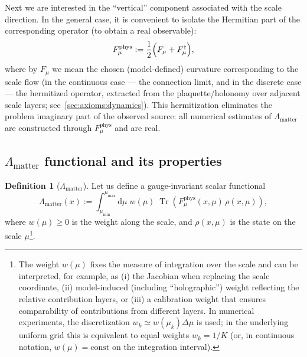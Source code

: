 \documentclass[11pt,a4paper]{article}
\DeclareMathOperator{\Tr}{Tr}
\newcommand{\dd}{\mathrm{d}}
\theoremstyle{definition}
\newtheorem{definition}{Definition}[section]
\theoremstyle{plain}
\theoremstyle{remark}
\begin{document}
Next we are interested in the “vertical” component associated with the scale direction.
In the general case, it is convenient to isolate the Hermitian part of the corresponding operator (to obtain a real observable):
\begin{equation}\label{eq:Fphys_def}
F_{\mu}^{\mathrm{phys}} := \frac{1}{2}\Bigl(F_{\mu}+F_{\mu}^\dagger\Bigr),
\end{equation}
where by $F_\mu$ we mean the chosen (model-defined) curvature corresponding to the scale flow
(in the continuous case --- the connection limit, and in the discrete case --- the hermitized operator,
extracted from the plaquette/holonomy over adjacent scale layers; see\ \cref{sec:axioms:dynamics}).
This hermitization eliminates the problem imaginary part of the observed source:
all numerical estimates of $\Lambda_{\mathrm{matter}}$ are constructed through $F_{\mu}^{\mathrm{phys}}$ and are real.

\subsection[Lambda\_matter functional and its properties]{$\Lambda_{\mathrm{matter}}$ functional and its properties}
\label{sec:theory:Lambdadef}

\begin{definition}[$\Lambda_{\mathrm{matter}}$]\label{def:Lambdamatter}
Let us define a gauge-invariant scalar functional
\begin{equation}\label{eq:Lambdamatter_def}
\Lambda_{\mathrm{matter}}(x)
:=
\int_{\mu_{\min}}^{\mu_{\max}} \dd\mu\; w(\mu)\;
\Tr\!\left(F_{\mu}^{\mathrm{phys}}(x,\mu)\,\rho(x,\mu)\right),
\end{equation}
where $w(\mu)\ge 0$ is the weight along the scale, and $\rho(x,\mu)$ is the state on the scale $\mu$\footnote{The weight $w(\mu)$ fixes the measure of integration over the scale and can be interpreted, for example, as (i) the Jacobian when replacing the scale coordinate, (ii) model-induced (including “holographic”) weight reflecting the relative contribution layers, or (iii) a calibration weight that ensures comparability of contributions from different layers. In numerical experiments, the discretization $w_k\simeq w(\mu_k)\Delta\mu$ is used; in the underlying uniform grid this is equivalent to equal weights $w_k=1/K$ (or, in continuous notation, $w(\mu)=\mathrm{const}$ on the integration interval).}.
\end{definition}
\end{document}
